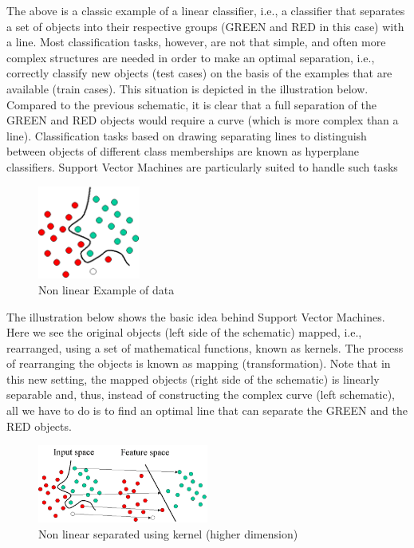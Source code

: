 The above is a classic example of a linear classifier, i.e., a classifier that separates a set of objects into their respective groups (GREEN and RED in this case) with a line. Most classification tasks, however, are not that simple, and often more complex structures are needed in order to make an optimal separation, i.e., correctly classify new objects (test cases) on the basis of the examples that are available (train cases). This situation is depicted in the illustration below. Compared to the previous schematic, it is clear that a full separation of the GREEN and RED objects would require a curve (which is more complex than a line). Classification tasks based on drawing separating lines to distinguish between objects of different class memberships are known as hyperplane classifiers. Support Vector Machines are particularly suited to handle such tasks


\begin{figure}[H]
\centering
\includegraphics[width=0.3\textwidth]{img/svm2.png}
\caption{Non linear Example of data  }
\label{123 }
\end{figure}

The illustration below shows the basic idea behind Support Vector Machines. Here we see the original objects (left side of the schematic) mapped, i.e., rearranged, using a set of mathematical functions, known as kernels. The process of rearranging the objects is known as mapping (transformation). Note that in this new setting, the mapped objects (right side of the schematic) is linearly separable and, thus, instead of constructing the complex curve (left schematic), all we have to do is to find an optimal line that can separate the GREEN and the RED objects.

\begin{figure}[H]
\centering
\includegraphics[width=0.5\textwidth]{img/SVMIntro3.png}
\caption{Non linear separated using kernel (higher dimension) }
\label{124 }
\end{figure}


